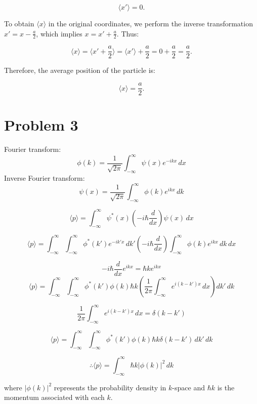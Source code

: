 \documentclass[12pt]{article}
\begin{document}
\begin{enumerate}
          \[
              \langle x' \rangle = 0.
          \]

          To obtain \(\langle x \rangle\) in the original coordinates, we perform the inverse transformation \(x' = x - \frac{a}{2}\), which implies \(x = x' + \frac{a}{2}\). Thus:

          \[
              \langle x \rangle = \langle x' + \frac{a}{2} \rangle = \langle x' \rangle + \frac{a}{2} = 0 + \frac{a}{2} = \frac{a}{2}.
          \]

          Therefore, the average position of the particle is:

          \[
              \langle x \rangle = \frac{a}{2}.
          \]

\end{enumerate}
\newpage
\section{Problem 3}
Fourier transform:
\[
    \phi(k) = \frac{1}{\sqrt{2\pi}} \int_{-\infty}^{\infty} \psi(x) e^{-ikx} \, dx
\]
Inverse Fourier transform:
\[
    \psi(x) = \frac{1}{\sqrt{2\pi}} \int_{-\infty}^{\infty} \phi(k) e^{ikx} \, dk
\]

\[
    \langle p \rangle = \int_{-\infty}^{\infty} \psi^*(x) \left( -i \hbar \frac{d}{dx} \right) \psi(x) \, dx
\]


\[
    \langle p \rangle = \int_{-\infty}^{\infty} \int_{-\infty}^{\infty} \phi^*(k') e^{-ik'x} \, dk' \left( -i \hbar \frac{d}{dx} \right) \int_{-\infty}^{\infty} \phi(k) e^{ikx} \, dk \, dx
\]

\[
    -i \hbar \frac{d}{dx} e^{ikx} = \hbar k e^{ikx}
\]
\[
    \langle p \rangle = \int_{-\infty}^{\infty} \int_{-\infty}^{\infty} \phi^*(k') \phi(k) \hbar k \left( \frac{1}{2\pi} \int_{-\infty}^{\infty} e^{i(k - k')x} \, dx \right) dk' \, dk
\]

\[
    \frac{1}{2\pi} \int_{-\infty}^{\infty} e^{i(k - k')x} \, dx = \delta(k - k')
\]

\[
    \langle p \rangle = \int_{-\infty}^{\infty} \int_{-\infty}^{\infty} \phi^*(k') \phi(k) \hbar k \delta(k - k')\, dk' \, dk
\]

\[ \therefore
    \langle p \rangle = \int_{-\infty}^{\infty} \hbar k |\phi(k)|^2 \, dk
\]

where \(|\phi(k)|^2\) represents the probability density in \(k\)-space and \(\hbar k\) is the momentum associated with each \(k\).

\newpage
\end{document}
